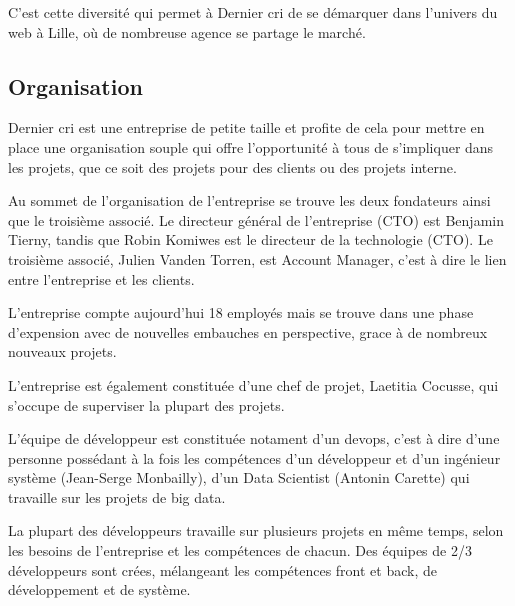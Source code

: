 \documentclass[12pt,a4paper]{article}
\begin{document}
  \bigskip

  C'est cette diversité qui permet à Dernier cri de se démarquer dans
  l'univers du web à Lille, où de nombreuse agence se partage le marché.

  \bigskip

  \subsection{Organisation}\label{organisation}

  \bigskip

  Dernier cri est une entreprise de petite taille et profite de cela pour
  mettre en place une organisation souple qui offre l'opportunité à tous
  de s'impliquer dans les projets, que ce soit des projets pour des
  clients ou des projets interne.

  \bigskip

  Au sommet de l'organisation de l'entreprise se trouve les deux
  fondateurs ainsi que le troisième associé. Le directeur général de
  l'entreprise (CTO) est Benjamin Tierny, tandis que Robin Komiwes est le
  directeur de la technologie (CTO). Le troisième associé, Julien Vanden
  Torren, est Account Manager, c'est à dire le lien entre l'entreprise et
  les clients.

  \bigskip

  L'entreprise compte aujourd'hui 18 employés mais se trouve dans une
  phase d'expension avec de nouvelles embauches en perspective, grace à de
  nombreux nouveaux projets.

  \bigskip

  L'entreprise est également constituée d'une chef de projet, Laetitia
  Cocusse, qui s'occupe de superviser la plupart des projets.

  \bigskip

  L'équipe de développeur est constituée notament d'un devops, c'est à
  dire d'une personne possédant à la fois les compétences d'un développeur
  et d'un ingénieur système (Jean-Serge Monbailly), d'un Data Scientist
  (Antonin Carette) qui travaille sur les projets de big data.

  \bigskip

  La plupart des développeurs travaille sur plusieurs projets en même
  temps, selon les besoins de l'entreprise et les compétences de chacun.
  Des équipes de 2/3 développeurs sont crées, mélangeant les compétences
  front et back, de développement et de système.

  \bigskip
\end{document}
